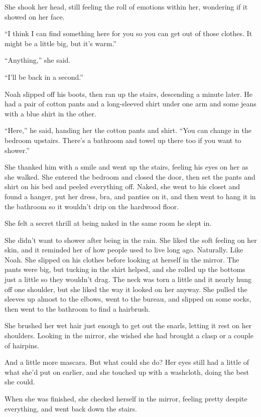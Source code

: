 \documentclass[10pt, twoside, openright]{book}
\begin{document}
She shook her head, still feeling the roll of emotions within her,
wondering if it showed on her face.

``I think I can find something here for you so you can get out of those
clothes. It might be a little big, but it's warm.''


``Anything,'' she said.

``I'll be back in a second.''


Noah slipped off his boots, then ran up the stairs, descending a minute
later. He had a pair of cotton pants and a long-sleeved shirt under one
arm and some jeans with a blue shirt in the other.

``Here,'' he said, handing her the cotton pants and shirt. ``You can
change in the bedroom upstairs. There's a bathroom and towel up there
too if you want to shower.''

She thanked him with a smile and went up the stairs, feeling his eyes on
her as she walked. She entered the bedroom and closed the door, then set
the pants and shirt on his bed and peeled everything off. Naked, she
went to his closet and found a hanger, put her dress, bra, and panties
on it, and then went to hang it in the bathroom so it wouldn't drip on
the hardwood floor.

She felt a secret thrill at being naked in the same room he slept in.

She didn't want to shower after being in the rain. She liked the soft
feeling on her skin, and it reminded her of how people used to live long
ago. Naturally. Like Noah. She slipped on his clothes before looking at
herself in the mirror. The pants were big, but tucking in the shirt
helped, and she rolled up the bottoms just a little so they wouldn't
drag. The neck was torn a little and it nearly hung off one shoulder,
but she liked the way it looked on her anyway. She pulled the sleeves up
almost to the elbows, went to the bureau, and slipped on some socks,
then went to the bathroom to find a hairbrush.

She brushed her wet hair just enough to get out the snarls, letting it
rest on her shoulders. Looking in the mirror, she wished she had brought
a clasp or a couple of hairpins.

And a little more mascara. But what could she do? Her eyes still had a
little of what she'd put on earlier, and she touched up with a
washcloth, doing the best she could.

When she was finished, she checked herself in the mirror, feeling pretty
despite everything, and went back down the stairs.
\end{document}
